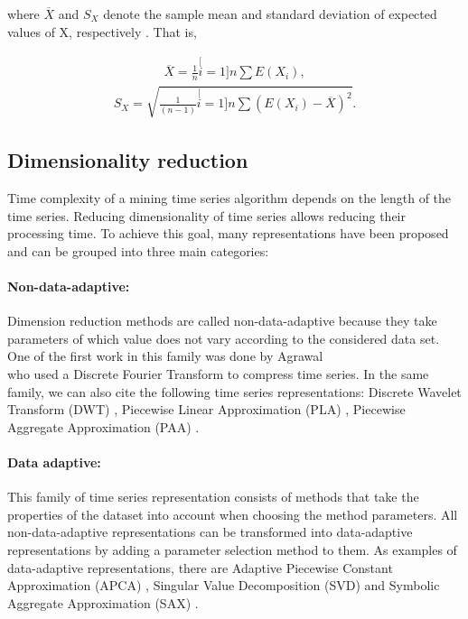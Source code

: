 where $\overline{X}$ and $S_{X}$ denote the sample mean and standard deviation of expected values of X, respectively \cite{Orang2015}. That is,

\begin{eqnarray}
\overline{X}=\frac{1}{n}\stackrel[i=1]{n}{\sum}E(X_{i}),
\end{eqnarray}
\begin{eqnarray}
S_{X}=\sqrt{\frac{1}{(n-1)}\stackrel[i=1]{n}{\sum}(E(X_{i})-\overline{X})^{2}}.
\end{eqnarray}


\subsection{Dimensionality reduction}
Time complexity of a mining time series algorithm depends on the length of the time series. Reducing dimensionality of time series allows reducing their processing time. To achieve this goal, many representations have been proposed and can be grouped into three main categories: 

\paragraph{Non-data-adaptive:}Dimension reduction methods are called non-data-adaptive because they take parameters of which value does not vary according to the considered data set. One of the first work in this family was done by Agrawal \\ \cite{Agrawal1993} who used a Discrete Fourier Transform to compress time series. In the same family, we can also cite the following time series representations:  Discrete Wavelet Transform (DWT) \cite{chan1999efficient}, Piecewise Linear Approximation (PLA) \cite{eriksson2004piecewise}, Piecewise Aggregate Approximation (PAA) \cite{Keogh2001a}. 

\paragraph{Data adaptive:} This family of time series representation  consists of methods that take the properties of the dataset into account when choosing the method parameters. All non-data-adaptive representations can be transformed into data-adaptive representations by adding a parameter selection method to them. As examples of data-adaptive representations, there are Adaptive Piecewise Constant Approximation (APCA) \cite{keogh2001locally}, Singular Value Decomposition (SVD) \cite{de1994singular} and Symbolic Aggregate Approximation (SAX) \cite{lin2003symbolic}.

